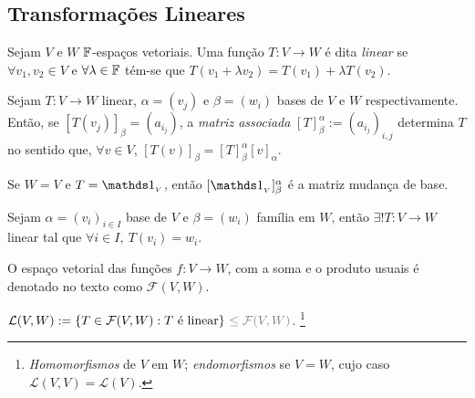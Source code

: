 \subsection*{Transformações Lineares}

\begin{definition}
    Sejam \(V\) e \(W\) \(\mathbb{F}\)-espaços vetoriais. Uma função \(T: V \to W\) é dita \emph{linear} se \(\forall v_1, v_2 \in V\) e \(\forall \lambda \in \mathbb{F} \) tém-se que \(T(v_1 + \lambda v_2) = T(v_1) + \lambda T(v_2)\). 
\end{definition}

\begin{definition}
    Sejam \(T: V \to W\) linear, \(\alpha = (v_j)\) e \(\beta = (w_i)\) bases de \(V\) e \(W \) respectivamente. Então, se \([T(v_j)]_\beta= (a_{i_j})\), a \emph{matriz associada} \([T]_\beta^\alpha := (a_{i_j})_{i,j}\) determina \(T\) no sentido que, \(\forall v \in V\), \([T(v)]_\beta = [T]_\beta^\alpha [v]_\alpha\). 
\end{definition}

\begin{note}
    Se \(W= V \) e \(T = \id_{_V}\), então \([\id_{_V}]^\alpha_\beta\) é a matriz mudança de base. 
\end{note}

\begin{theorem}
    \label{thm:6.1.6}
    Sejam \(\alpha = (v_i)_{i\in I}\) base de \(V\) e \(\beta = (w_i)\) família em \(W\), então \(\exists ! T:V\to W \) linear tal que \(\forall i \in I,\ T(v_i) = w_i\). 
\end{theorem}
    
\begin{note}
    O espaço vetorial das funções \(f: V \to W\), com a soma e o produto usuais é denotado no texto como \(\mathcal{F}(V,W)\).   
\end{note}

\renewcommand{\hom}{\mathcal{L}}
\newcommand{\ehom}{\mathcal{L}}

\begin{definition}  
  \centering \(\hom(V,W):= \{T \in \mathcal{F}(V,W): T \text{ é linear}\} \ \textcolor{gray}{\leq \mathcal{F}(V,W)}\). \footnote{\emph{Homomorfismos} de \(V\) em \(W\); \emph{endomorfismos} se \(V=W\), cujo caso \(\hom(V, V) = \ehom(V)\).}%
\end{definition}   

